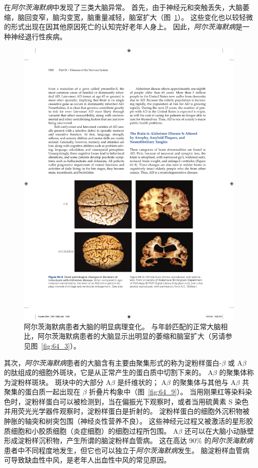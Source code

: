 在\textit{阿尔茨海默病}中发现了三类大脑异常。
首先，由于神经元和突触丢失，大脑萎缩，脑回变窄，脑沟变宽，脑重量减轻，脑室扩大（图~\ref{fig:64_8}）。
这些变化也以较轻微的形式出现在因其他原因死亡的认知完好老年人身上。
因此，\textit{阿尔茨海默病}是一种神经退行性疾病。


\begin{figure}[htbp]
	\centering
	\includegraphics[width=0.9\linewidth]{chap64/fig_64_8}
	\caption{阿尔茨海默病患者大脑的明显病理变化。
		与年龄匹配的正常大脑相比，阿尔茨海默病患者的大脑显示出明显的萎缩和脑室扩大（另请参见图~\ref{fig:64_3}）。}
	\label{fig:64_8}
\end{figure}


其次，\textit{阿尔茨海默病}患者的大脑含有主要由聚集形式的称为淀粉样蛋白-$\beta$ 或 A$\beta$ 的肽组成的细胞外斑块，它是从正常产生的蛋白质中切割下来的。
A$\beta$ 的聚集体称为淀粉样斑块。
斑块中的大部分 A$\beta$ 是纤维状的；
A$\beta$ 的聚集体与其他与 A$\beta$ 共聚集的蛋白质一起出现在 $\beta$ 折叠片构象中（图~\ref{fig:64_9}）。
当用刚果红等染料染色时，淀粉样蛋白可以被检测到，当在偏振光下观察时，或者当用硫黄素 S 染色并用荧光光学器件观察时，淀粉样蛋白是折射的。
淀粉样蛋白的细胞外沉积物被肿胀的轴突和树突包围（神经炎性营养不良）。
这些神经元过程又被激活的星形胶质细胞和小胶质细胞（炎症细胞）的细胞过程所包围。
A$\beta$ 还可以在大脑小动脉壁形成淀粉样沉积物，产生所谓的脑淀粉样血管病。
这在高达 90\% 的\textit{阿尔茨海默病}患者中不同程度地发生，但它也可以独立于\textit{阿尔茨海默病}发生。
脑淀粉样血管病可导致缺血性中风，是老年人出血性中风的常见原因。


